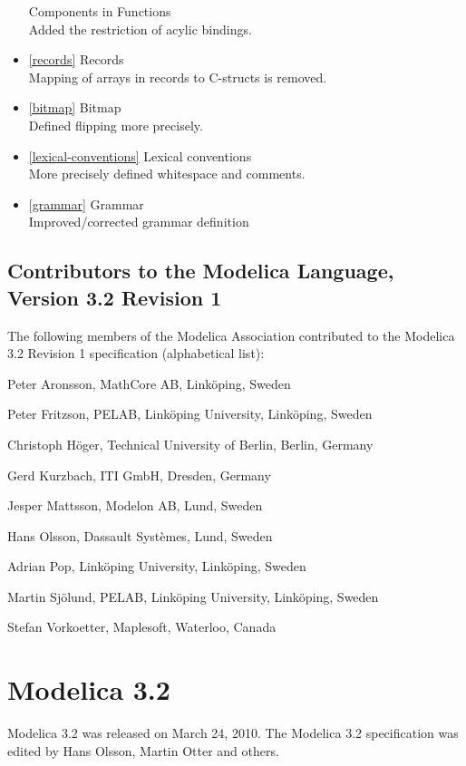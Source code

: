 \documentclass[../MLS.tex]{subfiles}
\begin{document}
\begin{itemize}
  Components in Functions\\
  Added the restriction of acylic bindings.
\item
  \autoref{records} Records\\
  Mapping of arrays in records to C-structs is removed.
\item
  \autoref{bitmap} Bitmap\\
  Defined flipping more precisely.
\item
  \autoref{lexical-conventions} Lexical conventions\\
  More precisely defined whitespace and comments.
\item
  \autoref{grammar} Grammar\\
  Improved/corrected grammar definition
\end{itemize}

\subsection{Contributors to the Modelica Language, Version 3.2 Revision 1}

The following members of the Modelica Association contributed to the
Modelica 3.2 Revision 1 specification (alphabetical list):

Peter Aronsson, MathCore AB, Linköping, Sweden

Peter Fritzson, PELAB, Linköping University, Linköping, Sweden

Christoph Höger, Technical University of Berlin, Berlin, Germany

Gerd Kurzbach, ITI GmbH, Dresden, Germany

Jesper Mattsson, Modelon AB, Lund, Sweden

Hans Olsson, Dassault Systèmes, Lund, Sweden

Adrian Pop, Linköping University, Linköping, Sweden

Martin Sjölund, PELAB, Linköping University, Linköping, Sweden

Stefan Vorkoetter, Maplesoft, Waterloo, Canada

\section{Modelica 3.2}

Modelica 3.2 was released on March 24, 2010. The Modelica 3.2
specification was edited by Hans Olsson, Martin Otter and others.
\end{document}
